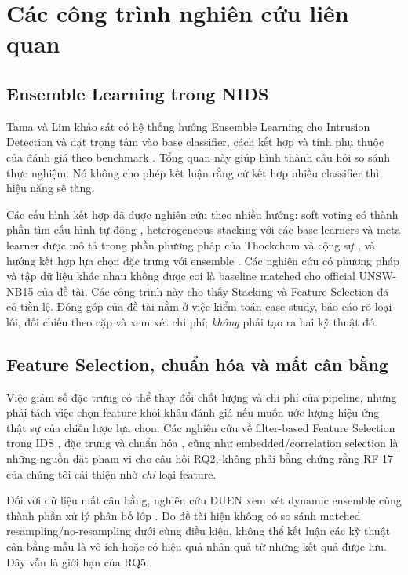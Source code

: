\section{Các công trình nghiên cứu liên quan}
\label{chap:tong-quan}

\subsection{Ensemble Learning trong NIDS}
Tama và Lim khảo sát có hệ thống hướng Ensemble Learning cho Intrusion Detection và đặt trọng tâm vào base classifier, cách kết hợp và tính phụ thuộc của đánh giá theo benchmark \cite{legacyL01}. Tổng quan này giúp hình thành câu hỏi so sánh thực nghiệm. Nó không cho phép kết luận rằng cứ kết hợp nhiều classifier thì hiệu năng sẽ tăng.

Các cấu hình kết hợp đã được nghiên cứu theo nhiều hướng: soft voting có thành phần tìm cấu hình tự động \cite{legacyL05}, heterogeneous stacking với các base learners và meta learner được mô tả trong phần phương pháp của Thockchom và cộng sự \cite{legacyL06}, và hướng kết hợp lựa chọn đặc trưng với ensemble \cite{legacyL04,legacyL12}. Các nghiên cứu có phương pháp và tập dữ liệu khác nhau không được coi là baseline matched cho official UNSW-NB15 của đề tài. Các công trình này cho thấy Stacking và Feature Selection đã có tiền lệ. Đóng góp của đề tài nằm ở việc kiểm toán case study, báo cáo rõ loại lỗi, đối chiếu theo cặp và xem xét chi phí; \emph{không} phải tạo ra hai kỹ thuật đó.

\subsection{Feature Selection, chuẩn hóa và mất cân bằng}
Việc giảm số đặc trưng có thể thay đổi chất lượng và chi phí của pipeline, nhưng phải tách việc chọn feature khỏi khâu đánh giá nếu muốn ước lượng hiệu ứng thật sự của chiến lược lựa chọn. Các nghiên cứu về filter-based Feature Selection trong IDS \cite{legacyL08}, đặc trưng và chuẩn hóa \cite{legacyL11}, cũng như embedded/correlation selection \cite{legacyL12} là những nguồn đặt phạm vi cho câu hỏi RQ2, không phải bằng chứng rằng RF-17 của chúng tôi cải thiện nhờ \emph{chỉ} loại feature.

Đối với dữ liệu mất cân bằng, nghiên cứu DUEN xem xét dynamic ensemble cùng thành phần xử lý phân bố lớp \cite{legacyL07}. Do đề tài hiện không có so sánh matched resampling/no-resampling dưới cùng điều kiện, không thể kết luận các kỹ thuật cân bằng mẫu là vô ích hoặc có hiệu quả nhân quả từ những kết quả được lưu. Đây vẫn là giới hạn của RQ5.


